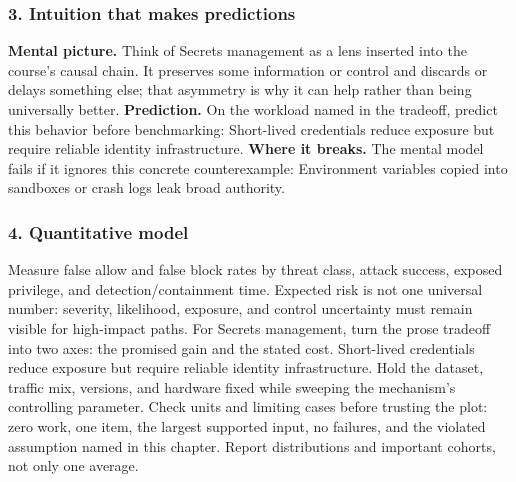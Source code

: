 \subsubsection*{3. Intuition that makes predictions}
\textbf{Mental picture.} Think of Secrets management as a lens inserted into the course's causal chain. It preserves some information or control and discards or delays something else; that asymmetry is why it can help rather than being universally better.
\textbf{Prediction.} On the workload named in the tradeoff, predict this behavior before benchmarking: Short-lived credentials reduce exposure but require reliable identity infrastructure.
\textbf{Where it breaks.} The mental model fails if it ignores this concrete counterexample: Environment variables copied into sandboxes or crash logs leak broad authority.
\subsubsection*{4. Quantitative model}
Measure false allow and false block rates by threat class, attack success, exposed privilege, and detection/containment time. Expected risk is not one universal number: severity, likelihood, exposure, and control uncertainty must remain visible for high-impact paths.
For Secrets management, turn the prose tradeoff into two axes: the promised gain and the stated cost. Short-lived credentials reduce exposure but require reliable identity infrastructure. Hold the dataset, traffic mix, versions, and hardware fixed while sweeping the mechanism's controlling parameter.
Check units and limiting cases before trusting the plot: zero work, one item, the largest supported input, no failures, and the violated assumption named in this chapter. Report distributions and important cohorts, not only one average.
